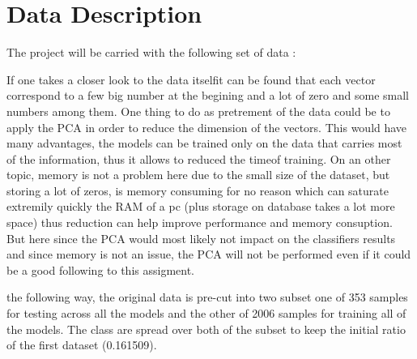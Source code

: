 \section{Data Description}

The project will be carried with the following set of data :

If one takes a closer look to the data itselfit can be found that each vector correspond to a few big number at the begining and a lot of zero and some small numbers among them. One thing to do as pretrement of the data could be to apply the PCA in order to reduce the dimension of the vectors. This would have many advantages, the models can be trained only on the data that carries most of the information, thus it allows to reduced the timeof training. On an other topic, memory is not a problem here due to the small size of the dataset, but storing a lot of zeros, is memory consuming for no reason which can saturate extremily quickly the RAM of a pc (plus storage on database takes a lot more space) thus reduction can help improve performance and memory consuption. But here since the PCA would most likely not impact on the classifiers results and since memory is not an issue, the PCA will not be performed even if it could be a good following to this assigment.

the following way, the original data is pre-cut into two subset one of 353 samples for testing across all the models and the other of 2006 samples for training all of the models. The class are spread over both of the subset to keep the initial ratio of the first dataset (0.161509).
